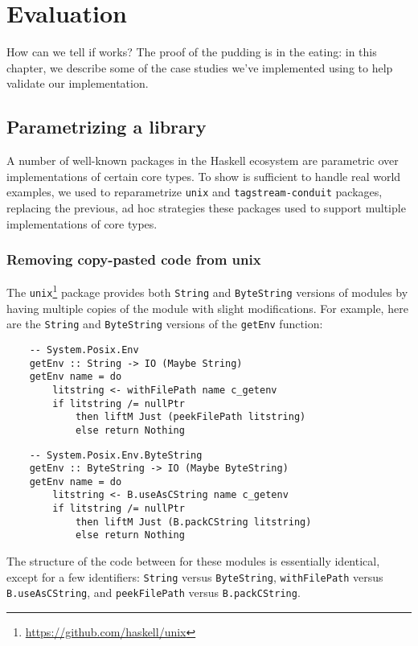 
\chapter{Evaluation}
\label{sec:evaluation}


How can we tell if \Backpack{} works?  The proof of the pudding is
in the eating: in this chapter, we describe some of the case studies
we've implemented using \Backpack{} to help validate our implementation.

\section{Parametrizing a library}

A number of well-known packages in the Haskell ecosystem are parametric over
implementations of certain core types.  To show \Backpack{} is sufficient
to handle real world examples, we used \Backpack{} to
reparametrize \verb|unix| and \verb|tagstream-conduit| packages, replacing
the previous, ad hoc strategies these packages used to support multiple
implementations of core types.

\subsection{Removing copy-pasted code from unix}

The \texttt{unix}\footnote{\smaller\url{https://github.com/haskell/unix}} package provides both \verb|String| and
\verb|ByteString| versions of modules by having multiple copies of the
module with slight modifications.  For example,  here are the \verb|String|
and \verb|ByteString| versions of the \verb|getEnv| function:

\begin{lstlisting}
    -- System.Posix.Env
    getEnv :: String -> IO (Maybe String)
    getEnv name = do
        litstring <- withFilePath name c_getenv
        if litstring /= nullPtr
            then liftM Just (peekFilePath litstring)
            else return Nothing
\end{lstlisting}

\begin{lstlisting}
    -- System.Posix.Env.ByteString
    getEnv :: ByteString -> IO (Maybe ByteString)
    getEnv name = do
        litstring <- B.useAsCString name c_getenv
        if litstring /= nullPtr
            then liftM Just (B.packCString litstring)
            else return Nothing
\end{lstlisting}
%
The structure of the code between for these modules is essentially identical,
except for a few identifiers: \verb|String| versus \verb|ByteString|,
\verb|withFilePath| versus \verb|B.useAsCString|, and \verb|peekFilePath|
versus \verb|B.packCString|.

